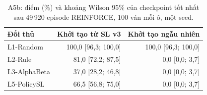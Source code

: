 \begin{table}[H]
  \centering\small
  \caption{A5b: điểm (\%) và khoảng Wilson 95\% của checkpoint tốt nhất sau 49\,920 episode REINFORCE, 100 ván mỗi ô, một seed.}
  \label{tab:a5b}
  \setlength{\tabcolsep}{4pt}
  \begin{tabular}{@{}lrr@{}}
    \toprule
    Đối thủ & Khởi tạo từ SL v3 & Khởi tạo ngẫu nhiên \\
    \midrule
    L1-Random & 100{,}0 [96{,}3; 100{,}0] & 100{,}0 [96{,}3; 100{,}0] \\
    L2-Rule & 81{,}0 [72{,}2; 87{,}5] & 0{,}0 [0{,}0; 3{,}7] \\
    L3-AlphaBeta & 37{,}0 [28{,}2; 46{,}8] & 0{,}0 [0{,}0; 3{,}7] \\
    L5-PolicySL & 66{,}5 [56{,}8; 75{,}0] & 0{,}0 [0{,}0; 3{,}7] \\
    \bottomrule
  \end{tabular}
\end{table}
